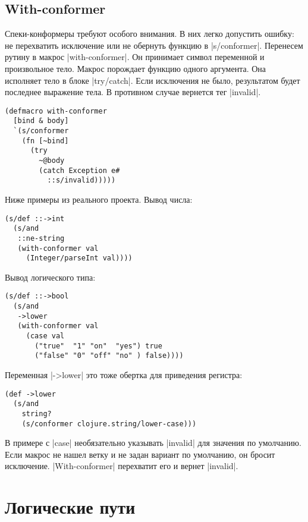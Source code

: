 \subsection{With-conformer}

Спеки-конформеры требуют особого внимания. В них легко допустить ошибку: не
перехватить исключение или не обернуть функцию в \spverb|s/conformer|. Перенесем
рутину в макрос \spverb|with-conformer|. Он принимает символ переменной и
произвольное тело. Макрос порождает функцию одного аргумента. Она исполняет тело
в блоке \spverb|try/catch|. Если исключения не было, результатом будет последнее
выражение тела. В противном случае вернется тег \spverb|invalid|.

\begin{verbatim}
(defmacro with-conformer
  [bind & body]
  `(s/conformer
    (fn [~bind]
      (try
        ~@body
        (catch Exception e#
          ::s/invalid)))))
\end{verbatim}

\noindent
Ниже примеры из реального проекта. Вывод числа:

\begin{verbatim}
(s/def ::->int
  (s/and
   ::ne-string
   (with-conformer val
     (Integer/parseInt val))))
\end{verbatim}

\noindent
Вывод логического типа:

\begin{verbatim}
(s/def ::->bool
  (s/and
   ->lower
   (with-conformer val
     (case val
       ("true"  "1" "on"  "yes") true
       ("false" "0" "off" "no" ) false))))
\end{verbatim}

\noindent
Переменная \spverb|->lower| это тоже обертка для приведения регистра:

\begin{verbatim}
(def ->lower
  (s/and
    string?
    (s/conformer clojure.string/lower-case)))
\end{verbatim}

В примере с \spverb|case| необязательно указывать \spverb|invalid| для значения
по умолчанию. Если макрос не нашел ветку и не задан вариант по умолчанию, он
бросит исключение. \spverb|With-conformer| перехватит его и вернет
\spverb|invalid|.


\section{Логические пути}

